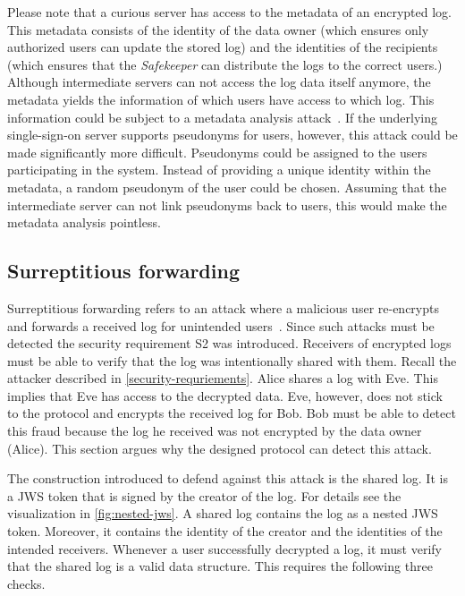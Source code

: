 \documentclass[../main.tex]{subfiles}
\begin{document}
Please note that a curious server has access to the metadata of an encrypted log.
This metadata consists of the identity of the data owner (which ensures only authorized users can update the stored log) and the identities of the recipients (which ensures that the \emph{Safekeeper} can distribute the logs to the correct users.)
Although intermediate servers can not access the log data itself anymore, the metadata yields the information of which users have access to which log.
This information could be subject to a metadata analysis attack~\cite{Greschbach2012,Mayer2016}.
If the underlying single-sign-on server supports pseudonyms for users, however, this attack could be made significantly more difficult.
Pseudonyms could be assigned to the users participating in the system.
Instead of providing a unique identity within the metadata, a random pseudonym of the user could be chosen.
Assuming that the intermediate server can not link pseudonyms back to users, this would make the metadata analysis pointless.

\subsection{Surreptitious forwarding}
Surreptitious forwarding refers to an attack where a malicious user re-encrypts and forwards a received log for unintended users~\cite{Davis2001}.
Since such attacks must be detected the security requirement S2 was introduced.
Receivers of encrypted logs must be able to verify that the log was intentionally shared with them.
Recall the attacker described in \cref{security-requriements}.
Alice shares a log with Eve.
This implies that Eve has access to the decrypted data.
Eve, however, does not stick to the protocol and encrypts the received log for Bob.
Bob must be able to detect this fraud because the log he received was not encrypted by the data owner (Alice).
This section argues why the designed protocol can detect this attack.

The construction introduced to defend against this attack is the shared log.
It is a JWS token that is signed by the creator of the log.
For details see the visualization in \cref{fig:nested-jws}.
A shared log contains the log as a nested JWS token.
Moreover, it contains the identity of the creator and the identities of the intended receivers.
Whenever a user successfully decrypted a log, it must verify that the shared log is a valid data structure.
This requires the following three checks.
\end{document}

